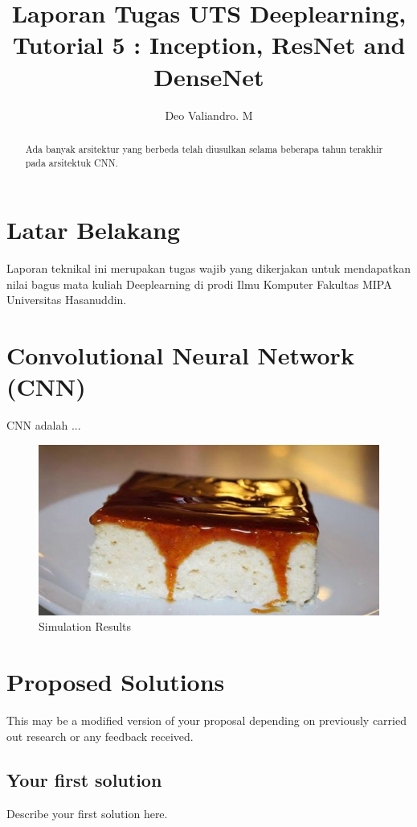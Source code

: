 \documentclass[peerreview]{IEEEtran}
\begin{document}
\title{Laporan Tugas UTS Deeplearning, Tutorial 5 : Inception, ResNet and DenseNet}

\author{Deo Valiandro. M}
\date{}

\maketitle
\tableofcontents
\listoffigures
\listoftables

\IEEEpeerreviewmaketitle
\begin{abstract}
Ada banyak arsitektur yang berbeda telah diusulkan selama beberapa tahun terakhir pada arsitektuk CNN.
\end{abstract}


\section{Latar Belakang}
Laporan teknikal ini merupakan tugas wajib yang dikerjakan untuk mendapatkan nilai bagus mata kuliah Deeplearning di prodi Ilmu Komputer Fakultas MIPA Universitas Hasanuddin.

\section{Convolutional Neural Network (CNN)}
CNN adalah ...


\begin{figure}[!h]
\centering
\includegraphics[width=0.8\columnwidth]{trilece}
\caption{Simulation Results}
\label{fig_sim}
\end{figure}

\section{Proposed Solutions}
This may be a modified version of your proposal depending on previously carried out research or any feedback received.
\subsection{Your first solution}
Describe your first solution here.
\end{document}
